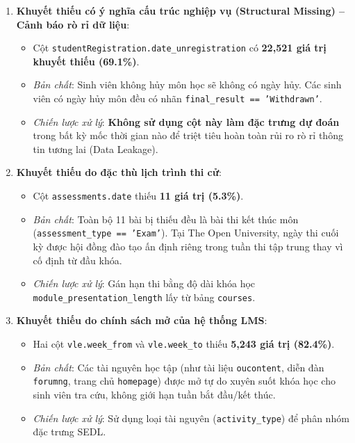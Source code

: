 \documentclass[11pt,a4paper]{article}
\begin{document}
\begin{enumerate}[leftmargin=*, itemsep=2pt, topsep=2pt]
    \item \textbf{Khuyết thiếu có ý nghĩa cấu trúc nghiệp vụ (Structural Missing) -- Cảnh báo rò rỉ dữ liệu}:
    \begin{itemize}
        \item Cột \texttt{studentRegistration.date\_unregistration} có \textbf{22,521 giá trị khuyết thiếu (69.1\%)}.
        \item \textit{Bản chất}: Sinh viên không hủy môn học sẽ không có ngày hủy. Các sinh viên có ngày hủy môn đều có nhãn \texttt{final\_result == 'Withdrawn'}.
        \item\textit{Chiến lược xử lý}: \textbf{Không sử dụng cột này làm đặc trưng dự đoán} trong bất kỳ mốc thời gian nào để triệt tiêu hoàn toàn rủi ro rò rỉ thông tin tương lai (Data Leakage).
    \end{itemize}

    \item \textbf{Khuyết thiếu do đặc thù lịch trình thi cử}:
    \begin{itemize}
        \item Cột \texttt{assessments.date} thiếu \textbf{11 giá trị (5.3\%)}.
        \item \textit{Bản chất}: Toàn bộ 11 bài bị thiếu đều là bài thi kết thúc môn (\texttt{assessment\_type == 'Exam'}). Tại The Open University, ngày thi cuối kỳ được hội đồng đào tạo ấn định riêng trong tuần thi tập trung thay vì cố định từ đầu khóa.
        \item \textit{Chiến lược xử lý}: Gán hạn thi bằng độ dài khóa học \texttt{module\_presentation\_length} lấy từ bảng \texttt{courses}.
    \end{itemize}

    \item \textbf{Khuyết thiếu do chính sách mở của hệ thống LMS}:
    \begin{itemize}
        \item Hai cột \texttt{vle.week\_from} và \texttt{vle.week\_to} thiếu \textbf{5,243 giá trị (82.4\%)}.
        \item \textit{Bản chất}: Các tài nguyên học tập (như tài liệu \texttt{oucontent}, diễn đàn \texttt{forumng}, trang chủ \texttt{homepage}) được mở tự do xuyên suốt khóa học cho sinh viên tra cứu, không giới hạn tuần bắt đầu/kết thúc.
        \item \textit{Chiến lược xử lý}: Sử dụng loại tài nguyên (\texttt{activity\_type}) để phân nhóm đặc trưng SEDL.
    \end{itemize}


\end{enumerate}
\end{document}

